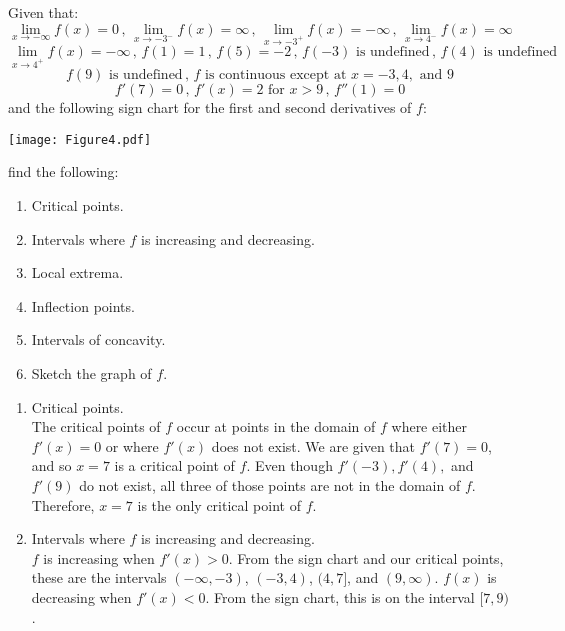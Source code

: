\documentclass[handout,nooutcomes]{ximera}
\begin{document}
\begin{problem}
Given that:
$$ \lim_{x \to - \infty} f(x) = 0 \, , \, \lim_{x \to -3^-} f(x) = \infty \, , \, \lim_{x \to -3^+} f(x) = - \infty \, , \, \lim_{x \to 4^-} f(x) = \infty $$
$$ \lim_{x \to 4^+} f(x) = -\infty \, , \, f(1) = 1 \, , \, f(5) = -2 \, , \, f(-3) \text{ is undefined} \, , \, f(4) \text{ is undefined} $$
$$ f(9) \text{ is undefined} \, , \, f \text{ is continuous except at } x=-3, 4, \text{ and } 9 $$
$$ f'(7) = 0 \, , \, f'(x) = 2 \text{ for } x > 9 \, , \, f''(1) = 0 $$
and the following sign chart for the first and second derivatives of $f$:

	\begin{image}
	\texttt{[image: Figure4.pdf]}
	\end{image}
	
find the following:
	\begin{enumerate}
	
	\item  Critical points.
	\item  Intervals where $f$ is increasing and decreasing.
	\item  Local extrema.
	\item  Inflection points.
	\item  Intervals of concavity.
	\item  Sketch the graph of $f$.
	
	\end{enumerate}
	
		\begin{freeResponse}
		
			\begin{enumerate}
			
			\item  Critical points. \\
			The critical points of $f$ occur at points in the domain of $f$ where either $f'(x)=0$ or where $f'(x)$ does not exist.  We are given that $f'(7)=0$, and so $x=7$ is a critical point of $f$.  Even though $f'(-3), f'(4),$ and $f'(9)$ do not exist, all three of those points are not in the domain of $f$.  Therefore, $x=7$ is the only critical point of $f$.  
			
			\item  Intervals where $f$ is increasing and decreasing.  \\
			$f$ is increasing when $f'(x)>0$.  From the sign chart and our critical points, these are the intervals $(-\infty ,-3)$, $(-3,4)$, $(4,7]$, and $(9,\infty )$. 
$f(x)$ is decreasing when $f'(x)<0$.  From the sign chart, this is on the interval $[7,9)$.
			

\end{enumerate}
\end{freeResponse}
\end{problem}
\end{document}
